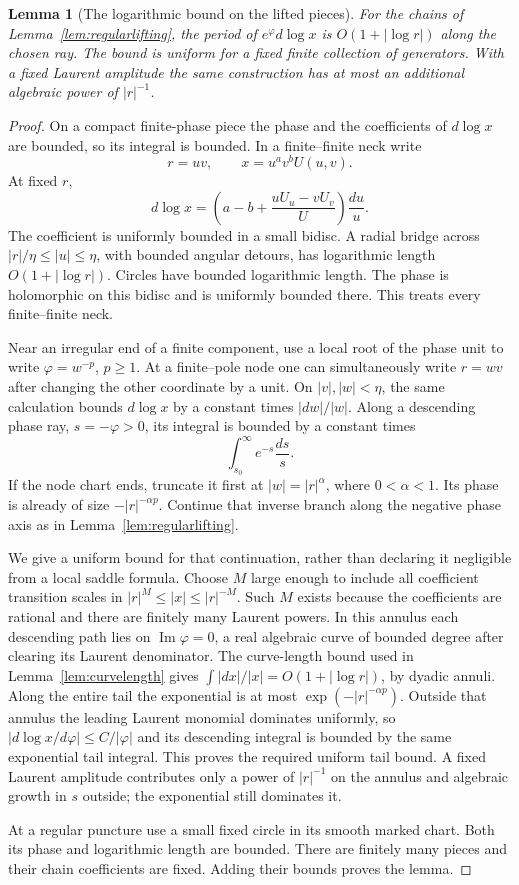 \documentclass[11pt]{article}
\newtheorem{lemma}[theorem]{Lemma}
\theoremstyle{definition}\newtheorem{definition}[theorem]{Definition}
\theoremstyle{remark}\newtheorem{remark}[theorem]{Remark}
\begin{document}
\begin{lemma}[The logarithmic bound on the lifted pieces]
\label{lem:logpieces}
For the chains of Lemma~\ref{lem:regularlifting}, the period of
$e^{\varphi}d\log x$ is $O(1+|\log r|)$ along the chosen ray.
The bound is uniform for a fixed finite collection of generators.
With a fixed Laurent amplitude the same construction has at most
an additional algebraic power of $|r|^{-1}$.
\end{lemma}
\begin{proof}
On a compact finite-phase piece the phase and the coefficients of
$d\log x$ are bounded, so its integral is bounded. In a finite--finite
neck write
\[
 r=uv,\qquad x=u^a v^b U(u,v).
\]
At fixed $r$,
\[
 d\log x=\left(a-b+\frac{uU_u-vU_v}{U}\right)\frac{du}{u}.
\]
The coefficient is uniformly bounded in a small bidisc. A radial
bridge across $|r|/\eta\leq|u|\leq\eta$, with bounded angular
detours, has logarithmic length $O(1+|\log r|)$. Circles have bounded
logarithmic length. The phase is holomorphic on this bidisc and is
uniformly bounded there. This treats every finite--finite neck.

Near an irregular end of a finite component, use a local root of
the phase unit to write $\varphi=w^{-p}$, $p\geq1$. At a
finite--pole node one can simultaneously write $r=wv$ after changing
the other coordinate by a unit. On $|v|,|w|<\eta$, the same
calculation bounds $d\log x$ by a constant times $|dw|/|w|$.
Along a descending phase ray, $s=-\varphi>0$, its integral is bounded
by a constant times
\[
 \int_{s_0}^{\infty}e^{-s}\frac{ds}{s}.
\]
If the node chart ends, truncate it first at $|w|=|r|^\alpha$,
where $0<\alpha<1$. Its phase is already of size
$-|r|^{-\alpha p}$. Continue that inverse branch along the negative
phase axis as in Lemma~\ref{lem:regularlifting}.

We give a uniform bound for that continuation, rather than declaring
it negligible from a local saddle formula. Choose $M$ large enough
to include all coefficient transition scales in
$|r|^M\leq|x|\leq|r|^{-M}$. Such $M$ exists because the coefficients
are rational and there are finitely many Laurent powers. In this
annulus each descending path lies on $\operatorname{Im}\varphi=0$,
a real algebraic curve of bounded degree after clearing its Laurent
denominator. The curve-length bound used in
Lemma~\ref{lem:curvelength} gives
$\int|dx|/|x|=O(1+|\log r|)$, by dyadic annuli. Along the entire
tail the exponential is at most
$\exp(-|r|^{-\alpha p})$. Outside that annulus the leading Laurent
monomial dominates uniformly, so
$|d\log x/d\varphi|\leq C/|\varphi|$ and its descending integral
is bounded by the same exponential tail integral. This proves the
required uniform tail bound. A fixed Laurent amplitude contributes
only a power of $|r|^{-1}$ on the annulus and algebraic growth in
$s$ outside; the exponential still dominates it.

At a regular puncture use a small fixed circle in its smooth marked
chart. Both its phase and logarithmic length are bounded. There are
finitely many pieces and their chain coefficients are fixed.
Adding their bounds proves the lemma.
\end{proof}
\end{document}
